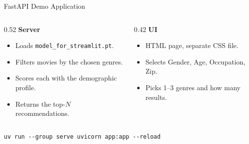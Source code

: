 \documentclass[aspectratio=169]{beamer}
\begin{document}
\begin{frame}[fragile]{FastAPI Demo Application}
\begin{columns}
  \begin{column}{0.52\textwidth}
    \textbf{Server}
    \begin{itemize}
      \item Loads \texttt{model\_for\_streamlit.pt}.
      \item Filters movies by the chosen genres.
      \item Scores each with the demographic profile.
      \item Returns the top-$N$ recommendations.
    \end{itemize}
  \end{column}
  \begin{column}{0.42\textwidth}
    \textbf{UI}
    \begin{itemize}
      \item HTML page, separate CSS file.
      \item Selects Gender, Age, Occupation, Zip.
      \item Picks 1--3 genres and how many results.
    \end{itemize}
  \end{column}
\end{columns}

\vspace{0.25cm}

\begin{lstlisting}[style=code]
uv run --group serve uvicorn app:app --reload
\end{lstlisting}
\end{frame}
\end{document}
